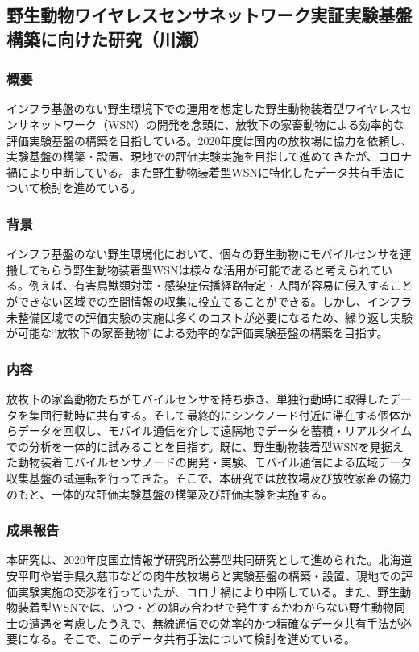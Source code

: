 \subsection{野生動物ワイヤレスセンサネットワーク実証実験基盤構築に向けた研究（川瀬）}
\subsubsection{概要}
インフラ基盤のない野生環境下での運用を想定した野生動物装着型ワイヤレスセンサネットワーク（WSN）の開発を念頭に、放牧下の家畜動物による効率的な評価実験基盤の構築を目指している。2020年度は国内の放牧場に協力を依頼し、実験基盤の構築・設置、現地での評価実験実施を目指して進めてきたが、コロナ禍により中断している。また野生動物装着型WSNに特化したデータ共有手法について検討を進めている。
\subsubsection{背景}
インフラ基盤のない野生環境化において、個々の野生動物にモバイルセンサを運搬してもらう野生動物装着型WSNは様々な活用が可能であると考えられている。例えば、有害鳥獣類対策・感染症伝播経路特定・人間が容易に侵入することができない区域での空間情報の収集に役立てることができる。しかし、インフラ未整備区域での評価実験の実施は多くのコストが必要になるため、繰り返し実験が可能な“放牧下の家畜動物”による効率的な評価実験基盤の構築を目指す。
\subsubsection{内容}
放牧下の家畜動物たちがモバイルセンサを持ち歩き、単独行動時に取得したデータを集団行動時に共有する。そして最終的にシンクノード付近に滞在する個体からデータを回収し、モバイル通信を介して遠隔地でデータを蓄積・リアルタイムでの分析を一体的に試みることを目指す。既に、野生動物装着型WSNを見据えた動物装着モバイルセンサノードの開発・実験、モバイル通信による広域データ収集基盤の試運転を行ってきた。そこで、本研究では放牧場及び放牧家畜の協力のもと、一体的な評価実験基盤の構築及び評価実験を実施する。
\subsubsection  {成果報告}
本研究は、2020年度国立情報学研究所公募型共同研究として進められた。北海道安平町や岩手県久慈市などの肉牛放牧場らと実験基盤の構築・設置、現地での評価実験実施の交渉を行っていたが、コロナ禍により中断している。また、野生動物装着型WSNでは、いつ・どの組み合わせで発生するかわからない野生動物同士の遭遇を考慮したうえで、無線通信での効率的かつ精確なデータ共有手法が必要になる。そこで、このデータ共有手法について検討を進めている。
